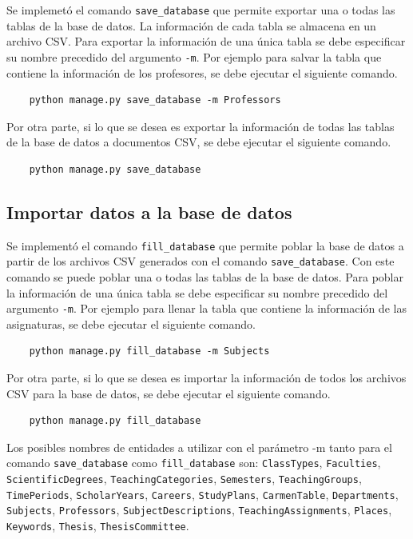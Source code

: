 Se implemetó el comando \texttt{save\_database}
que permite exportar una o todas las tablas de la base de datos.
La información de cada tabla se almacena en un archivo CSV.
Para exportar la información de una única tabla
se debe especificar su nombre precedido del argumento \texttt{-m}. Por 
ejemplo para salvar la tabla que contiene la información de los profesores, se debe 
ejecutar el siguiente comando.

\begin{verbatim}
    python manage.py save_database -m Professors
\end{verbatim}


Por otra parte, si lo que se desea es exportar la información de todas las tablas 
de la base de datos a documentos CSV, se debe ejecutar el siguiente comando.

\begin{verbatim}
    python manage.py save_database
\end{verbatim}


\subsection{Importar datos a la base de datos}
Se implementó el comando \texttt{fill\_database} que permite poblar la 
base de datos a partir de los archivos CSV generados con el comando \texttt{save\_database}.
Con este comando se puede poblar una o todas las tablas de la base de 
datos. 
Para poblar la información de una única tabla
se debe especificar su nombre precedido del argumento \texttt{-m}. Por 
ejemplo para llenar la tabla que contiene la información de las asignaturas, se debe 
ejecutar el siguiente comando.

\begin{verbatim}
    python manage.py fill_database -m Subjects
\end{verbatim}

Por otra parte, si lo que se desea es importar la información de todos los archivos CSV  
para la base de datos, se debe ejecutar el siguiente comando.

\begin{verbatim}
    python manage.py fill_database
\end{verbatim}


Los posibles nombres de entidades a utilizar con
el parámetro -m tanto para el comando 
\texttt{save\_database} como \texttt{fill\_database} son:
\texttt{ClassTypes}, \texttt{Faculties},
\texttt{ScientificDegrees}, \texttt{TeachingCategories},
\texttt{Semesters}, \texttt{TeachingGroups}, \texttt{TimePeriods}, \texttt{ScholarYears},
\texttt{Careers}, \texttt{StudyPlans}, \texttt{CarmenTable}, \texttt{Departments},
\texttt{Subjects}, \texttt{Professors}, \texttt{SubjectDescriptions}, \texttt{TeachingAssignments},
\texttt{Places}, \texttt{Keywords}, \texttt{Thesis}, \texttt{ThesisCommittee}. \\


